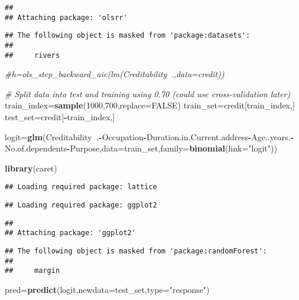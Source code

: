\documentclass[]{article}
\newenvironment{Shaded}{\begin{snugshade}}{\end{snugshade}}
\newcommand{\CommentTok}[1]{\textcolor[rgb]{0.56,0.35,0.01}{\textit{#1}}}
\newcommand{\DataTypeTok}[1]{\textcolor[rgb]{0.13,0.29,0.53}{#1}}
\newcommand{\DecValTok}[1]{\textcolor[rgb]{0.00,0.00,0.81}{#1}}
\newcommand{\KeywordTok}[1]{\textcolor[rgb]{0.13,0.29,0.53}{\textbf{#1}}}
\newcommand{\NormalTok}[1]{#1}
\newcommand{\OperatorTok}[1]{\textcolor[rgb]{0.81,0.36,0.00}{\textbf{#1}}}
\newcommand{\OtherTok}[1]{\textcolor[rgb]{0.56,0.35,0.01}{#1}}
\newcommand{\StringTok}[1]{\textcolor[rgb]{0.31,0.60,0.02}{#1}}
\begin{document}
\begin{verbatim}
## 
## Attaching package: 'olsrr'
\end{verbatim}

\begin{verbatim}
## The following object is masked from 'package:datasets':
## 
##     rivers
\end{verbatim}

\begin{Shaded}
\begin{Highlighting}[]
\CommentTok{#h=ols_step_backward_aic(lm(Creditability~.,data=credit))}

\CommentTok{# Split data into test and training using 0.70 (could use cross-validation later)}
\NormalTok{train_index=}\KeywordTok{sample}\NormalTok{(}\DecValTok{1000}\NormalTok{,}\DecValTok{700}\NormalTok{,}\DataTypeTok{replace=}\OtherTok{FALSE}\NormalTok{)}
\NormalTok{train_set=credit[train_index,]}
\NormalTok{test_set=credit[}\OperatorTok{-}\NormalTok{train_index,]}

\NormalTok{logit=}\KeywordTok{glm}\NormalTok{(Creditability}\OperatorTok{~}\NormalTok{.}\OperatorTok{-}\NormalTok{Occupation}\OperatorTok{-}\NormalTok{Duration.in.Current.address}\OperatorTok{-}\NormalTok{Age..years.}\OperatorTok{-}\NormalTok{No.of.dependents}\OperatorTok{-}\NormalTok{Purpose,}\DataTypeTok{data=}\NormalTok{train_set,}\DataTypeTok{family=}\KeywordTok{binomial}\NormalTok{(}\DataTypeTok{link=}\StringTok{"logit"}\NormalTok{))}

\KeywordTok{library}\NormalTok{(caret)}
\end{Highlighting}
\end{Shaded}

\begin{verbatim}
## Loading required package: lattice
\end{verbatim}

\begin{verbatim}
## Loading required package: ggplot2
\end{verbatim}

\begin{verbatim}
## 
## Attaching package: 'ggplot2'
\end{verbatim}

\begin{verbatim}
## The following object is masked from 'package:randomForest':
## 
##     margin
\end{verbatim}

\begin{Shaded}
\begin{Highlighting}[]
\NormalTok{pred=}\KeywordTok{predict}\NormalTok{(logit,}\DataTypeTok{newdata=}\NormalTok{test_set,}\DataTypeTok{type=}\StringTok{"response"}\NormalTok{)}
\end{Highlighting}
\end{Shaded}
\end{document}
